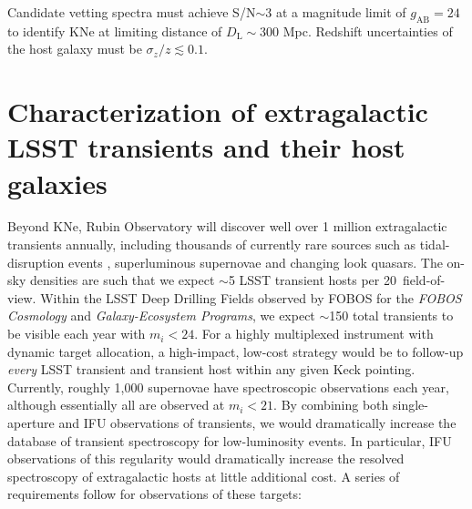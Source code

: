 \documentclass[11pt,a4paper,twoside,onecolumn,openany,final,oldfontcommands]{memoir}
\begin{document}

\begin{sciencerequirement}
\reqitem Candidate vetting spectra must achieve S/N$\sim$3 at a magnitude limit of $g_\mathrm{AB}=24$ to identify KNe at limiting distance of $D_\mathrm{L}\sim300$ Mpc. 
\reqitem Redshift uncertainties of the host galaxy must be $\sigma_z/z \lesssim0.1$.
\end{sciencerequirement}

\section{Characterization of extragalactic LSST transients and their host galaxies}


Beyond KNe, Rubin Observatory will discover well over 1 million extragalactic transients annually, including thousands of currently rare sources such as tidal-disruption events \citep{bricman2020}, superluminous supernovae \citep{villar2018} and changing look quasars.  The on-sky densities are such that we expect $\sim$5 LSST transient hosts per 20\arcmin\ field-of-view.  Within the LSST Deep Drilling Fields observed by FOBOS for the {\it FOBOS Cosmology} and {\it Galaxy-Ecosystem Programs}, we expect $\sim$150 total transients to be visible each year with $m_i<24$. For a highly multiplexed instrument with dynamic target allocation, a high-impact, low-cost strategy would be to follow-up \textit{every} LSST transient and transient host within any given Keck pointing. Currently, roughly 1,000 supernovae have spectroscopic observations each year, although essentially all are observed at $m_i<21$. By combining both single-aperture and IFU observations of transients, we would dramatically increase the database of transient spectroscopy for low-luminosity events.  In particular, IFU observations of this regularity would dramatically increase the resolved spectroscopy of extragalactic hosts \citep[see a recent review by][]{anderson2015} at little additional cost. A series of requirements follow for observations of these targets:
\end{document}
